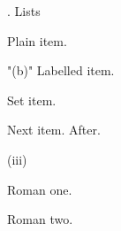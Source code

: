 
\document
{}. Lists\endhead
\roster
\item Plain item.
\item"(b)" Labelled item.
\item[5] Set item.
\item Next item.
\endroster
After.
\def\therosteritem#1{\rom{(\romannumeral#1)}}
\roster \widestnumber\item{(iii)}
\item Roman one.
\item Roman two.
\endroster
\enddocument
